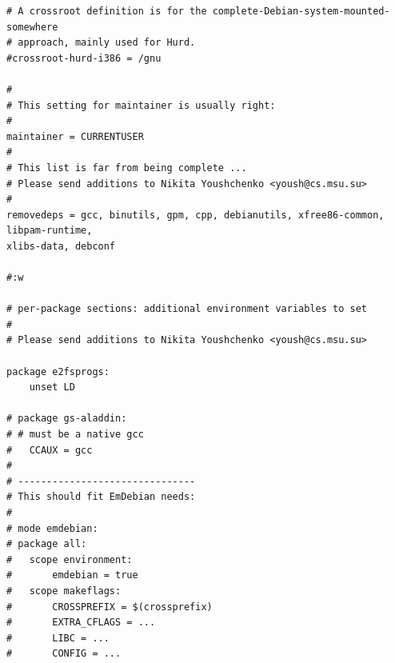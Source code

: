 \documentclass[mingoth,a4paper]{jsarticle}
\begin{document}
{\begin{verbatim}
# A crossroot definition is for the complete-Debian-system-mounted-somewhere
# approach, mainly used for Hurd.
#crossroot-hurd-i386 = /gnu

#
# This setting for maintainer is usually right:
#
maintainer = CURRENTUSER
#
# This list is far from being complete ...
# Please send additions to Nikita Youshchenko <yoush@cs.msu.su>
#
removedeps = gcc, binutils, gpm, cpp, debianutils, xfree86-common, libpam-runtime, 
xlibs-data, debconf

#:w

# per-package sections: additional environment variables to set
#
# Please send additions to Nikita Youshchenko <yoush@cs.msu.su>

package e2fsprogs:
    unset LD

# package gs-aladdin:
# # must be a native gcc
#   CCAUX = gcc
#
# -------------------------------
# This should fit EmDebian needs:
#
# mode emdebian:
# package all:
#   scope environment:
#       emdebian = true
#   scope makeflags:
#       CROSSPREFIX = $(crossprefix)
#       EXTRA_CFLAGS = ...
#       LIBC = ...
#       CONFIG = ...

\end{verbatim}
}
\end{document}
